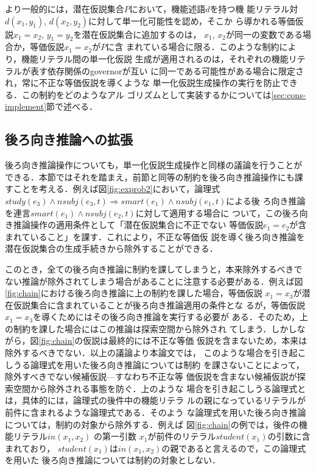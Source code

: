 \documentclass[japanese]{jnlp_1.4}
\begin{document}
より一般的には，潜在仮説集合$P$において，機能述語$d$を持つ機
能リテラル対$d(x_1,y_1)$, $d(x_2,y_2)$に対して単一化可能性を認め，そこか
ら導かれる等価仮説$x_1=x_2$, $y_1=y_2$を潜在仮説集合に追加するのは，
$x_1$, $x_2$が同一の変数である場合か，等価仮説$x_1=x_2$が$P$に含
まれている場合に限る．このような制約により，機能リテラル間の単一化仮説
生成が適用されるのは，それぞれの機能リテラルが表す依存関係のgovernorが互い
に同一である可能性がある場合に限定され，常に不正な等価仮説を導くような
単一化仮説生成操作の実行を防止できる．この制約をどのようなアル
ゴリズムとして実装するかについては\ref{sec:cons-implement}節で述べる．


\subsection{後ろ向き推論への拡張}
\label{sec:cons-chain}

後ろ向き推論操作についても，単一化仮説生成操作と同様の議論を行うことが
できる．本節ではそれを踏まえ，前節と同等の制約を後ろ向き推論操作にも課
すことを考える．例えば図\ref{fig:exprob2}において，論理式$\mathit{study}(e_3)
\land \mathit{nsubj}(e_3,t) \Rightarrow \mathit{smart}(e_1) \land \mathit{nsubj}(e_1,t)$による後
ろ向き推論を連言$\mathit{smart}(e_1) \land \mathit{nsubj}(e_2,t)$に対して適用する場合に
ついて，この後ろ向き推論操作の適用条件として「潜在仮説集合に不正でない
等価仮説$e_1=e_2$が含まれていること」を課す．これにより，不正な等価仮
説を導く後ろ向き推論を潜在仮説集合の生成手続きから除外することができる．

このとき，全ての後ろ向き推論に制約を課してしまうと，本来除外するべきで
ない推論が除外されてしまう場合があることに注意する必要がある．例えば図
\ref{fig:chain}における後ろ向き推論に上の制約を課した場合，等価仮説
$x_1=x_3$が潜在仮説集合に含まれていることが後ろ向き推論適用の条件とな
るが，等価仮説$x_1=x_3$を導くためにはその後ろ向き推論を実行する必要が
ある．そのため，上の制約を課した場合にはこの推論は探索空間から除外され
てしまう．しかしながら，図\ref{fig:chain}の仮説は最終的には不正な等価
仮説を含まないため，本来は除外するべきでない．以上の議論より本論文では，
このような場合を引き起こしうる論理式を用いた後ろ向き推論については制約
を課さないことによって，除外すべきでない候補仮説—すなわち不正な等
価仮説を含まない候補仮説が探索空間から除外される事態を防ぐ．上のような
場合を引き起こしうる論理式とは，具体的には，論理式の後件中の機能リテラ
ルの親になっているリテラルが前件に含まれるような論理式である．そのよう
な論理式を用いた後ろ向き推論については，制約の対象から除外する．例えば
図\ref{fig:chain}の例では，後件の機能リテラル$in(x_1,x_2)$ の第一引数
$x_1$が前件のリテラル$\mathit{student}(x_1)$の引数に含まれており，
$\mathit{student}(x_1)$は$in(x_1,x_2)$の親であると言えるので，この論理式を用いた
後ろ向き推論については制約の対象としない．
\end{document}
